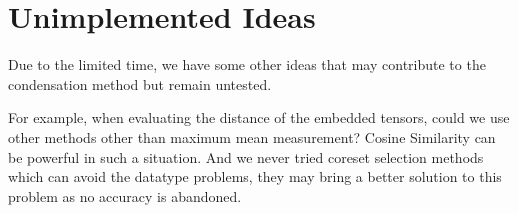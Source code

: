 \documentclass{article}
\begin{document}
\section{Unimplemented Ideas}

Due to the limited time, we have some other ideas that may contribute to the condensation method but remain untested. 

For example, when evaluating the distance of the embedded tensors, could we use other methods other than maximum mean measurement? Cosine Similarity can be powerful in such a situation. And we never tried coreset selection methods which can avoid the datatype problems, they may bring a better solution to this problem as no accuracy is abandoned.










\end{document}
